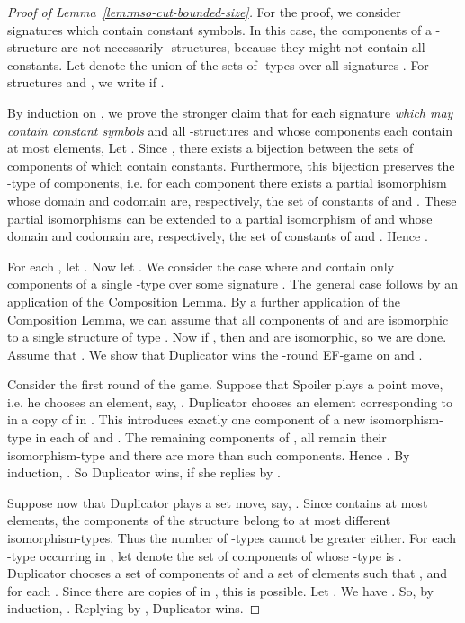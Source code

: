 \documentclass[11pt]{article}
\begin{document}
\begin{proof}[Proof of Lemma~\ref{lem:mso-cut-bounded-size}]
  For the proof, we consider signatures  which contain
  constant symbols. In this case, the components of a
  -structure are not necessarily -structures, because
  they might not contain all constants. Let  denote the
  union of the sets of -types over all signatures . For -structures 
  and , we write  if .

  By induction on , we prove the stronger claim that for each
  signature  \emph{which may contain constant symbols} and all
  -structures  and  whose components each contain at
  most  elements,
   Let
  . Since , there exists a bijection 
  between the sets  of components of  which
  contain constants. Furthermore, this bijection preserves the
  -type of components, i.e. for each component  there
  exists a partial isomorphism  whose domain and codomain are,
  respectively, the set of constants of  and . These
  partial isomorphisms can be extended to a partial isomorphism  of  and  whose domain and
  codomain are, respectively, the set of constants of  and
  . Hence .

  For each , let . Now let . We consider
  the case where  and  contain only components of a single
  -type  over some signature . The
  general case follows by an application of the Composition Lemma. By
  a further application of the Composition Lemma, we can assume that
  all components of  and  are isomorphic to a single
  structure  of type . Now if ,
  then  and  are isomorphic, so we are done. Assume that
  . We show that Duplicator wins the
  -round EF-game on  and .
  
  Consider the first round of the game. Suppose that Spoiler plays a
  point move, i.e. he chooses an element, say, . Duplicator
  chooses an element  corresponding to  in a copy of  in
  . This introduces exactly one component of a new
  isomorphism-type  in each of  and . The
  remaining components of ,  all remain their
  isomorphism-type and there are more than  such
  components. Hence . By
  induction, . So Duplicator wins, if
  she replies by .

  Suppose now that Duplicator plays a set move, say, .
  Since  contains at most  elements, the components of the
  structure  belong to at most  different
  isomorphism-types. Thus the number of -types cannot be greater
  either. For each -type  occurring in , let
   denote the set of components of  whose -type is
  . Duplicator chooses a set  of components of
   and a set of elements  such that , and  for each . Since there are 
  copies of  in , this is possible. Let . We have . So, by induction, . Replying by , Duplicator wins.
\end{proof}
\end{document}
